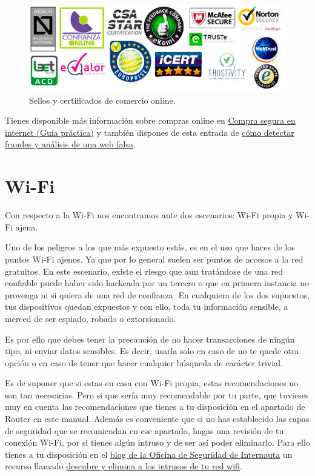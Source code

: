 \documentclass[
  spanish,
  a4paper,
  openany]{book}
\begin{document}
\begin{figure}

{\centering \includegraphics[width=0.75\linewidth]{images/sellos-de-confianza-online} 

}

\caption{Sellos y certificados de comercio online.}\label{fig:unnamed-chunk-11}
\end{figure}

Tienes disponible más información sobre compras online en \href{https://www.aepd.es/sites/default/files/2019-09/guia-compra-segura-digital-web.pdf}{Compra segura en internet (Guía práctica)} y también dispones de esta entrada de \href{https://www.osi.es/es/actualidad/blog/2018/08/08/detectando-fraudes-analisis-de-una-web-de-venta-falsa}{cómo detectar fraudes y análisis de una web falsa}.

\hypertarget{wi-fi}{%
\section{Wi-Fi}\label{wi-fi}}

Con respecto a la Wi-Fi nos encontramos ante dos escenarios: Wi-Fi propia y Wi-Fi ajena.

Uno de los peligros a los que más expuesto estás, es en el uso que haces de los puntos Wi-Fi ajenos. Ya que por lo general suelen ser puntos de accesos a la red gratuitos. En este escenario, existe el riesgo que aun tratándose de una red confiable puede haber sido hackeada por un tercero o que en primera instancia no provenga ni si quiera de una red de confianza. En cualquiera de los dos supuestos, tus dispositivos quedan expuestos y con ello, toda tu información sensible, a merced de ser espiado, robado o extorsionado.

Es por ello que debes tener la precaución de no hacer transacciones de ningún tipo, ni enviar datos sensibles. Es decir, usarla solo en caso de no te quede otra opción o en caso de tener que hacer cualquier búsqueda de carácter trivial.

Es de suponer que si estas en casa con Wi-Fi propia, estas recomendaciones no son tan necesarias. Pero si que sería muy recomendable por tu parte, que tuvieses muy en cuenta las recomendaciones que tienes a tu disposición en el apartado de Router en este manual. Además es conveniente que si no has establecido las capas de seguridad que se recomiendan en ese apartado, hagas una revisión de tu conexión Wi-Fi, por si tienes algún intruso y de ser así poder eliminarlo. Para ello tienes a tu disposición en el \href{https://www.osi.es/es/actualidad/blog}{blog de la Oficina de Seguridad de Internauta} un recurso llamado \href{https://www.osi.es/es/actualidad/blog/2019/09/25/descubre-y-elimina-los-intrusos-de-tu-red-wifi}{descubre y elimina a los intrusos de tu red wifi}.
\end{document}
